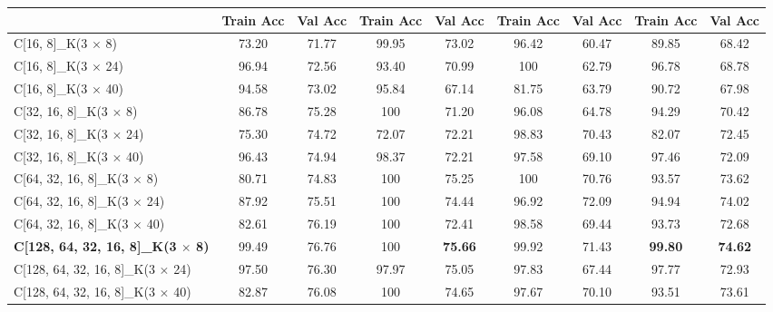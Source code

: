 \documentclass{ieeeaccess}
\begin{document}
{\begin{table*}[htb]
\begin{tabular}{|l|cc|cc|cc|cc|}
		&  \textbf{Train Acc} &  \textbf{Val Acc} &  \textbf{Train Acc} &  \textbf{Val Acc} &      \textbf{Train Acc} &     \textbf{Val Acc} &    \textbf{Train Acc} &   \textbf{Val Acc} \\
		\midrule
		C[16, 8]\_K(3 $\times$ 8)                    &      73.20 &       71.77 &        99.95 &         73.02 &      96.42 &      60.47 &      89.85 &      68.42 \\
		C[16, 8]\_K(3 $\times$ 24)                   &      96.94 &       72.56 &        93.40 &         70.99 &     100 &         62.79 &      96.78 &      68.78 \\
		C[16, 8]\_K(3 $\times$ 40)                   &      94.58 &       73.02 &        95.84 &         67.14 &      81.75 &      63.79 &      90.72 &      67.98 \\
		C[32, 16, 8]\_K(3 $\times$ 8)                &      86.78 &       75.28 &       100 &            71.20 &      96.08 &      64.78 &      94.29 &      70.42 \\
		C[32, 16, 8]\_K(3 $\times$ 24)               &      75.30 &       74.72 &        72.07 &         72.21 &      98.83 &      70.43 &      82.07 &      72.45 \\
		C[32, 16, 8]\_K(3 $\times$ 40)               &      96.43 &       74.94 &        98.37 &         72.21 &      97.58 &      69.10 &      97.46 &      72.09 \\
		C[64, 32, 16, 8]\_K(3 $\times$ 8)            &      80.71 &       74.83 &       100 &            75.25 &     100 &         70.76 &      93.57 &      73.62 \\
		C[64, 32, 16, 8]\_K(3 $\times$ 24)           &      87.92 &       75.51 &       100 &            74.44 &      96.92 &      72.09 &      94.94 &      74.02 \\
		C[64, 32, 16, 8]\_K(3 $\times$ 40)           &      82.61 &       76.19 &       100 &            72.41 &      98.58 &      69.44 &      93.73 &      72.68 \\
		\textbf{C[128, 64, 32, 16, 8]\_K(3 $\times$ 8)}  &  99.49 &       76.76 &       100 &    \textbf{75.66} &     99.92 &      71.43 &      \textbf{99.80} &      \textbf{74.62} \\
		C[128, 64, 32, 16, 8]\_K(3 $\times$ 24)      &      97.50 &       76.30 &        97.97 &         75.05 &      97.83 &      67.44 &      97.77 &      72.93 \\
		C[128, 64, 32, 16, 8]\_K(3 $\times$ 40)      &      82.87 &       76.08 &       100 &            74.65 &      97.67 &      70.10 &      93.51 &      73.61 \\

\end{tabular}
\end{table*}}
\end{document}
